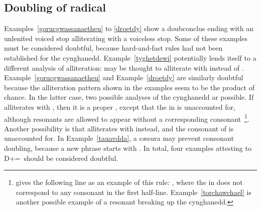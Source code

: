 \subsection{Doubling of radical \xD}
Examples~\ref{gorucgwassanaetheu} to \ref{droetdy}%
show a \gls{doubconclus} ending with an unlenited voiced stop alliterating with a voiceless stop.
Some of these examples must be considered doubtful, because hard-and-fast rules had not been established for the cynghanedd. Example~\ref{tyghetdewi} potentially lends itself to a different analysis of alliteration:  may be thought to alliterate with  instead of . Example~\ref{gorucgwassanaetheu} and Example~\ref{droetdy} are similarly doubtful because the alliteration pattern shown in the examples seem to be the product of chance. In the latter case, two possible analyses of the cynghanedd ar possible. If  alliterates with , then it is a proper , except that the  in  is unaccounted for, although resonants are allowed to appear without a corresponding consonant~\autocite[203--07]{jones_meddwl_2005}\footnote{\Textcite[203--07]{jones_meddwl_2005} gives the following line as an example of this rule: , where the  in  does not correspond to any consonant in the first half-line. Example~\ref{torchawchael} is another possible example of a resonant breaking up the cynghanedd.}. Another possibility is that   alliterates with  instead, and the consonant of  is unaccounted for. In Example~\ref{tauavdda}, a cæsura may prevent consonant doubling, because a new phrase starts with . In total, four examples attesting to \gls{D}+\xD=\xT\ should be considered doubtful.\begin{mwl}

\end{mwl}
